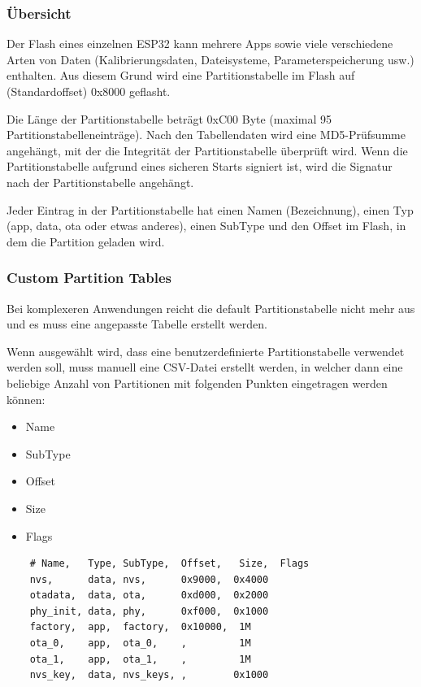 \subsubsection{Übersicht}
Der Flash eines einzelnen ESP32 kann mehrere Apps sowie viele verschiedene Arten von Daten (Kalibrierungsdaten, Dateisysteme, Parameterspeicherung usw.) enthalten. Aus diesem Grund wird eine Partitionstabelle im Flash auf (Standardoffset) 0x8000 geflasht.

Die Länge der Partitionstabelle beträgt 0xC00 Byte (maximal 95 Partitionstabelleneinträge). Nach den Tabellendaten wird eine MD5-Prüfsumme angehängt, mit der die Integrität der Partitionstabelle überprüft wird. Wenn die Partitionstabelle aufgrund eines sicheren Starts signiert ist, wird die Signatur nach der Partitionstabelle angehängt.

Jeder Eintrag in der Partitionstabelle hat einen Namen (Bezeichnung), einen Typ (app, data, ota oder etwas anderes), einen SubType und den Offset im Flash, in dem die Partition geladen wird.

\subsubsection{Custom Partition Tables}
Bei komplexeren Anwendungen reicht die default Partitionstabelle nicht mehr aus und es muss eine angepasste Tabelle erstellt werden.

Wenn ausgewählt wird, dass eine benutzerdefinierte Partitionstabelle verwendet werden soll, muss manuell eine CSV-Datei erstellt werden, in welcher dann eine beliebige Anzahl von Partitionen mit folgenden Punkten eingetragen werden können:

\begin{itemize}
    \item Name
    \item SubType
    \item Offset
    \item Size
    \item Flags
\end{itemize}

\begin{verbatim}
    # Name,   Type, SubType,  Offset,   Size,  Flags
    nvs,      data, nvs,      0x9000,  0x4000
    otadata,  data, ota,      0xd000,  0x2000
    phy_init, data, phy,      0xf000,  0x1000
    factory,  app,  factory,  0x10000,  1M
    ota_0,    app,  ota_0,    ,         1M
    ota_1,    app,  ota_1,    ,         1M
    nvs_key,  data, nvs_keys, ,        0x1000
\end{verbatim}

